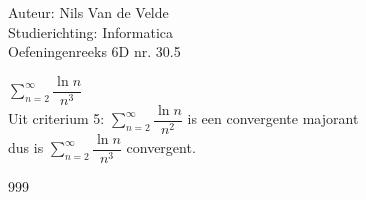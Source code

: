 \documentclass[a4paper]{article}
\newcommand{\lsum}{\displaystyle\sum\limits}
\begin{document}
  
\noindent \large Auteur: Nils Van de Velde \\
\noindent \large Studierichting: Informatica\\
\noindent \large Oefeningenreeks 6D nr. 30.5\\

\medskip

\normalsize

$\lsum_{n=2}^{\infty} \dfrac{\ln n}{n^3}$\\

Uit criterium 5: $\lsum_{n=2}^{\infty} \dfrac{\ln n}{n^2}$ is een convergente majorant\\

dus is $\lsum_{n=2}^{\infty} \dfrac{\ln n}{n^3}$ convergent.

\begin{thebibliography}{999}
\end{thebibliography}
\end{document}
